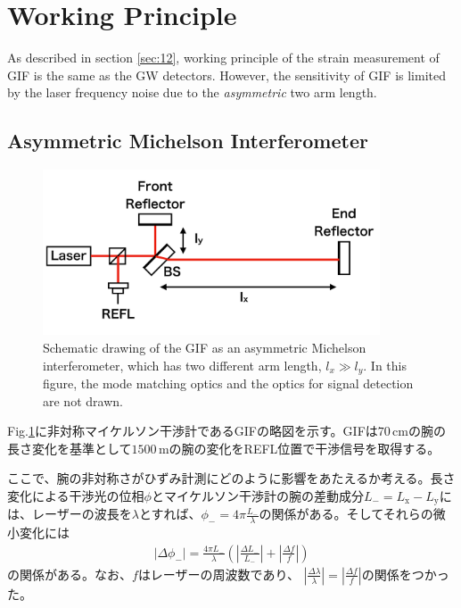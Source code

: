\section{Working Principle} \label{sec:sec42}
As described in section \cref{sec:12}, working principle of the strain measurement of GIF is the same as the GW detectors. However, the sensitivity of GIF is limited by the laser frequency noise due to the {\it asymmetric} two arm length.
\subsection{Asymmetric Michelson Interferometer}
\begin{figure}[h]
  \centering
  \includegraphics[width=10.0cm]{./img_chap4/img401.png}
  \caption{Schematic drawing of the GIF as an asymmetric Michelson interferometer, which has two different arm length, $l_x\gg{l_y}$. In this figure, the mode matching optics and the optics for signal detection are not drawn.} \label{img:img401}
\end{figure}

Fig.\ref{img:img401}に非対称マイケルソン干渉計であるGIFの略図を示す。GIFは$70\,\mathrm{cm}$の腕の長さ変化を基準として$1500\,\mathrm{m}$の腕の変化をREFL位置で干渉信号を取得する。

ここで、腕の非対称さがひずみ計測にどのように影響をあたえるか考える。長さ変化による干渉光の位相$\phi$とマイケルソン干渉計の腕の差動成分${L_{-}}=L_{\mathrm{x}}-L_{\mathrm{y}}$には、レーザーの波長を$\lambda$とすれば、${\phi}_{-} = 4\pi\frac{{L_{-}}}{\lambda}$の関係がある。そしてそれらの微小変化には
\begin{eqnarray}  
  \left|\Delta \phi_{-}\right| = \frac{4\pi{L_{-}}}{\lambda}\left( \left|\frac{\Delta L_{-}}{L_{-}}\right| + \left|\frac{\Delta f}{f}\right|\right) \label{eq:eq400}
\end{eqnarray}
の関係がある。なお、$f$はレーザーの周波数であり、 $|\frac{\Delta{\lambda}}{\lambda}| = |\frac{\Delta{f}}{f}|$の関係をつかった。

